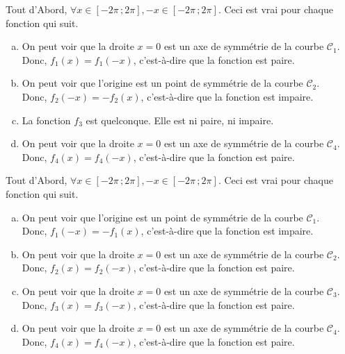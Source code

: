 \documentclass[12pt, a4paper]{article}
\begin{document}
\begin{Exercise}[number={77}]
    Tout d'Abord, $\forall x\in[-2\pi\,;2\pi], -x\in[-2\pi\,;2\pi]$. Ceci est vrai pour chaque fonction qui suit.
    \begin{enumerate}[a)]
        \item On peut voir que la droite $x=0$ est un axe de symmétrie de la courbe $\mathcal{C}_1$. \\ Donc, $f_1(x)=f_1(-x)$, c'est-à-dire que la fonction est paire.
        \item On peut voir que l'origine est un point de symmétrie de la courbe $\mathcal{C}_2$. \\ Donc, $f_2(-x)=-f_2(x)$, c'est-à-dire que la fonction est impaire.
        \item La fonction $f_3$ est quelconque. Elle est ni paire, ni impaire.
        \item On peut voir que la droite $x=0$ est un axe de symmétrie de la courbe $\mathcal{C}_4$. \\ Donc, $f_4(x)=f_4(-x)$, c'est-à-dire que la fonction est paire.
    \end{enumerate}
\end{Exercise}

\begin{Exercise}[number={78}]
    Tout d'Abord, $\forall x\in[-2\pi\,;2\pi], -x\in[-2\pi\,;2\pi]$. Ceci est vrai pour chaque fonction qui suit.
    \begin{enumerate}[a)]
        \item On peut voir que l'origine est un point de symmétrie de la courbe $\mathcal{C}_1$. \\ Donc, $f_1(-x)=-f_1(x)$, c'est-à-dire que la fonction est impaire.
        \item On peut voir que la droite $x=0$ est un axe de symmétrie de la courbe $\mathcal{C}_2$. \\ Donc, $f_2(x)=f_2(-x)$, c'est-à-dire que la fonction est paire.
        \item On peut voir que la droite $x=0$ est un axe de symmétrie de la courbe $\mathcal{C}_3$. \\ Donc, $f_3(x)=f_3(-x)$, c'est-à-dire que la fonction est paire.
        \item On peut voir que la droite $x=0$ est un axe de symmétrie de la courbe $\mathcal{C}_4$. \\ Donc, $f_4(x)=f_4(-x)$, c'est-à-dire que la fonction est paire.
    \end{enumerate}
\end{Exercise}
\end{document}
